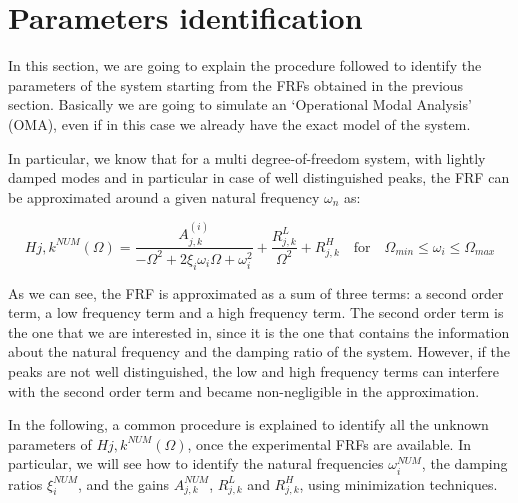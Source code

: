 \section{Parameters identification}
\label{sec:parameters_identification}

In this section, we are going to explain the procedure followed to identify the parameters of the system starting from the FRFs obtained in the previous section.
Basically we are going to simulate an `Operational Modal Analysis' (OMA), even if in this case we already have the exact model of the system.

In particular, we know that for a multi degree-of-freedom system, with lightly damped modes and in particular in case of well distinguished peaks, the FRF can be approximated around a given natural frequency $\omega_n$ as:

\begin{equation}
    H{j, k}^{NUM}(\Omega) = \frac{A_{j, k}^(i)}{-\Omega^2 + 2 \xi_i \omega_i \Omega + \omega_i^2} + \frac{R_{j, k}^L}{\Omega^2} + R_{j, k}^{H} \quad \text{for} \quad \Omega_{min} \leq \omega_i \leq \Omega_{max}
    \label{eq:FRF_approximation}
\end{equation}

As we can see, the FRF is approximated as a sum of three terms: a second order term, a low frequency term and a high frequency term.
The second order term is the one that we are interested in, since it is the one that contains the information about the natural frequency and the damping ratio of the system.
However, if the peaks are not well distinguished, the low and high frequency terms can interfere with the second order term and became non-negligible in the approximation.

In the following, a common procedure is explained to identify all the unknown parameters of $H{j, k}^{NUM}(\Omega)$, once the experimental FRFs are available.
In particular, we will see how to identify the natural frequencies $\omega_i^{NUM}$, the damping ratios $\xi_i^{NUM}$, and the gains $A_{j, k}^{NUM}$, $R_{j, k}^L$ and $R_{j, k}^H$, using minimization techniques.




